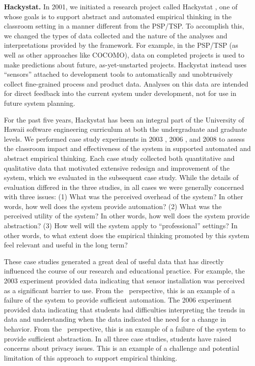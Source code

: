 {\bf Hackystat.} In 2001, we initiated a research project called Hackystat
\citep{csdl2-06-06,csdl2-04-11,csdl2-02-07}, one of whose goals is to
support abstract and automated empirical thinking in the classroom setting
in a manner different from the PSP/TSP.  To accomplish this, we changed the
types of data collected and the nature of the analyses and interpretations
provided by the framework.  For example, in the PSP/TSP (as well as other
approaches like COCOMO), data on completed projects is used to make
predictions about future, as-yet-unstarted projects. Hackystat
instead uses ``sensors'' attached to development tools to automatically and
unobtrusively collect fine-grained process and product data. Analyses on
this data are intended for direct feedback into the current system under
development, not for use in future system planning.

For the past five years, Hackystat has been an integral part of the
University of Hawaii software engineering curriculum at both the
undergraduate and graduate levels.  We performed case study experiments in
2003 \citep{csdl2-03-12,csdl2-03-13}, 2006 \citep{csdl2-07-02}, and 2008
\citep{csdl2-09-02,csdl2-09-03} to assess the classroom impact and
effectiveness of the system in supported automated and abstract empirical
thinking.  Each case study collected both quantitative and qualitative data
that motivated extensive redesign and improvement of the system, which we
evaluated in the subsequent case study. While the details of evaluation
differed in the three studies, in all cases we were generally concerned
with three issues: (1) What was the perceived overhead of the system? In
other words, how well does the system provide automation?  (2) What was the
perceived utility of the system? In other words, how well does the system
provide abstraction?  (3) How well will the system apply to
``professional'' settings?  In other words, to what extent does the
empirical thinking promoted by this system feel relevant and useful in the
long term?

These case studies generated a great deal of useful data that has directly
influenced the course of our research and educational practice. For
example, the 2003 experiment provided data indicating that sensor
installation was perceived as a significant barrier to use. From the \eCT\
perspective, this is an example of a failure of the system to provide
sufficient automation.  The 2006 experiment provided data indicating that
students had difficulties interpreting the trends in data and understanding
when the data indicated the need for a change in behavior.  From the \eCT\
perspective, this is an example of a failure of the system to provide
sufficient abstraction.  In all three case studies, students have raised
concerns about privacy issues.  This is an example of a challenge and
potential limitation of this approach to support empirical thinking.

